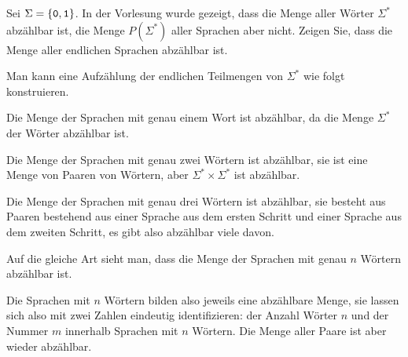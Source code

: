 Sei $\Sigma=\{{\tt 0},{\tt 1}\}$. In der Vorlesung wurde gezeigt, dass 
die Menge aller Wörter $\Sigma^*$ abzählbar ist, die Menge $P(\Sigma^*)$
aller Sprachen aber nicht. Zeigen Sie, dass die Menge aller endlichen
Sprachen abzählbar ist.

\begin{loesung}
Man kann eine Aufzählung der endlichen Teilmengen von $\Sigma^*$ wie
folgt konstruieren.
\begin{compactenum}
\item Die Menge der Sprachen mit genau einem Wort ist abzählbar, da die
Menge $\Sigma^*$ der Wörter abzählbar ist.
\item Die  Menge der Sprachen mit genau zwei Wörtern ist abzählbar,
sie ist eine Menge von Paaren von Wörtern, aber $\Sigma^*\times \Sigma^*$
ist abzählbar.
\item Die Menge der Sprachen mit genau drei Wörtern ist abzählbar,
sie besteht aus Paaren bestehend aus einer Sprache aus dem ersten
Schritt und einer Sprache aus dem zweiten Schritt, es gibt also 
abzählbar viele davon.
\item Auf die gleiche Art sieht man, dass die Menge der Sprachen mit
genau $n$ Wörtern abzählbar ist.
\end{compactenum}
Die Sprachen mit $n$ Wörtern bilden also jeweils eine abzählbare Menge,
sie lassen sich also mit zwei Zahlen eindeutig identifizieren: der Anzahl
Wörter $n$ und der Nummer $m$ innerhalb Sprachen mit $n$ Wörtern.
Die Menge aller Paare ist aber wieder abzählbar.
\end{loesung}

